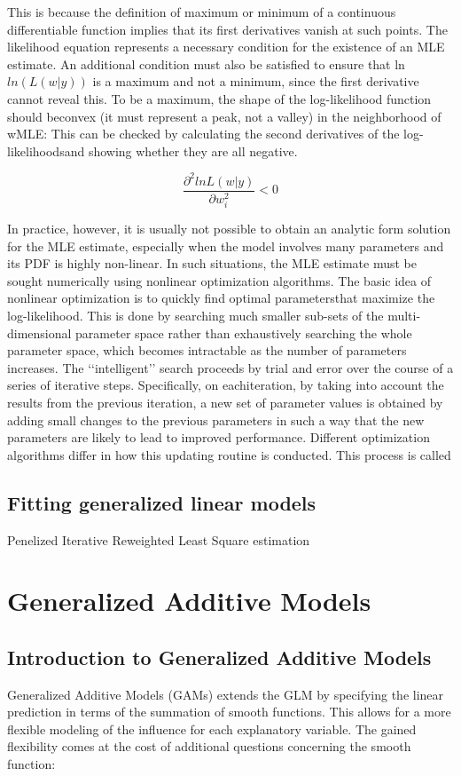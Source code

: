 \documentclass{article}
\begin{document}
    This is because the definition of maximum or minimum of a continuous differentiable function implies that its first derivatives vanish at such points. The likelihood equation represents a necessary condition for the existence of an MLE estimate. An additional condition must also be satisfied to ensure that ln $ln(L(w|y))$ is a maximum and not a minimum, since the first derivative cannot reveal this. To be a maximum, the shape of the log-likelihood function should beconvex (it must represent a peak, not a valley) in the neighborhood of wMLE: This can be checked by calculating the second derivatives of the log-likelihoodsand showing whether they are all negative.

    \begin{equation} \frac{\partial^2 ln L(w|y)}{\partial w^2_i} < 0 \end{equation}

    In practice, however, it is usually not possible to obtain an analytic form solution for the MLE estimate, especially when the model involves many parameters and its PDF is highly non-linear. In such situations, the MLE estimate must be sought numerically using nonlinear optimization algorithms. The basic idea of nonlinear optimization is to quickly find optimal parametersthat maximize the log-likelihood. This is done by searching much smaller sub-sets of the multi-dimensional parameter space rather than exhaustively searching the whole parameter space, which becomes intractable as the number of parameters increases. The ‘‘intelligent’’ search proceeds by trial and error over the
    course of a series of iterative steps. Specifically, on eachiteration, by taking into account the results from the previous iteration, a new set of parameter values is obtained by adding small changes to the previous parameters in such a way that the new parameters are likely to lead to improved performance. Different optimization algorithms differ in how this updating routine is conducted. This process is called

    \subsection{Fitting generalized linear models}
    Penelized Iterative Reweighted Least Square estimation

    \section{Generalized Additive Models}
    \subsection{Introduction to Generalized Additive Models}
    Generalized Additive Models (GAMs) extends the GLM by specifying the linear prediction in terms of the summation of smooth functions. This allows for a more flexible modeling of the influence for each explanatory variable. The gained flexibility comes at the cost of additional questions concerning the smooth function:
\end{document}

